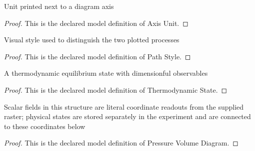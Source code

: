 \begin{definition}
  \label{def:physics:phyx-mini-0370:phyxminiproblems-problemphyxmini0370-axisunit}
  Unit printed next to a diagram axis
\end{definition}
\begin{proof}
  This is the declared model definition of Axis Unit.
\end{proof}
\begin{definition}
  \label{def:physics:phyx-mini-0370:phyxminiproblems-problemphyxmini0370-pathstyle}
  Visual style used to distinguish the two plotted processes
\end{definition}
\begin{proof}
  This is the declared model definition of Path Style.
\end{proof}
\begin{definition}
  \label{def:physics:phyx-mini-0370:phyxminiproblems-problemphyxmini0370-thermodynamicstate}
  A thermodynamic equilibrium state with dimensionful observables
\end{definition}
\begin{proof}
  This is the declared model definition of Thermodynamic State.
\end{proof}
\begin{definition}
  \label{def:physics:phyx-mini-0370:phyxminiproblems-problemphyxmini0370-pressurevolumediagram}
  Scalar fields in this structure are literal coordinate readouts from the supplied raster; physical states are stored separately in the experiment and are connected to these coordinates below
\end{definition}
\begin{proof}
  This is the declared model definition of Pressure Volume Diagram.
\end{proof}
